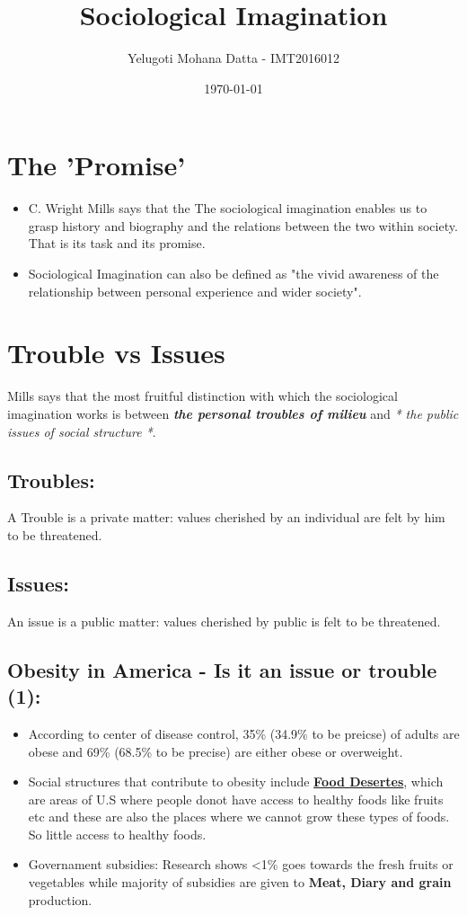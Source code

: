 \documentclass[11pt]{article}
\author{Yelugoti Mohana Datta - IMT2016012}
\date{\today}
\title{Sociological Imagination}
\begin{document}
\maketitle
\tableofcontents

\section{The 'Promise'}
\label{sec:orgc0cf889}
\begin{itemize}
\item C. Wright Mills says that the The sociological imagination enables us
to grasp history and biography and the relations between the two 
within society. That is its task and its promise.

\item Sociological Imagination can also be defined as "the vivid awareness
of the relationship between personal experience and wider society".
\end{itemize}
\section{Trouble vs Issues}
\label{sec:org825d946}
Mills says that the most fruitful distinction with which the sociological
imagination works is between \emph{\textbf{the personal troubles of milieu}} and 
\emph{* the public issues of social structure *}.

\subsection{Troubles:}
\label{sec:org7691998}
A Trouble is a private matter: values cherished by an individual are
felt by him to be threatened.

\subsection{Issues:}
\label{sec:org3d8b989}
An issue is a public matter: values cherished by public is felt to be
threatened.

\subsection{Obesity in America - Is it an issue or trouble (1):}
\label{sec:org2bce459}

\begin{itemize}
\item According to center of disease control, 35\% (34.9\% to be preicse) of 
adults are obese and 69\% (68.5\% to be precise) are either obese or 
overweight.

\item Social structures that contribute to obesity include \textbf{\uline{Food Desertes}},
which are areas of U.S where people donot have access to healthy foods
like fruits etc and these are also the places where we cannot grow these
types of foods. So little access to healthy foods.

\item Governament subsidies: Research shows <1\% goes towards the fresh fruits 
or vegetables while majority of subsidies are given to \textbf{Meat, Diary and
grain} production.
\end{itemize}
\end{document}
